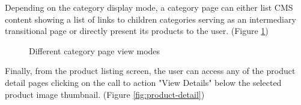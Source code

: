 Depending on the category display mode, a category page can either list CMS content showing a list of links to children categories serving as an intermediary transitional page or directly present its products to the user.
(Figure \ref{fig:category-display-modes})


\vspace{0.1cm}
\begin{figure}[htbp]
  \centering
  \qquad
  \caption{Different category page view modes}%
  \label{fig:category-display-modes}%
\end{figure}
\vspace{0.1cm}

Finally, from the product listing screen, the user can access any of the product detail pages clicking on the call to action "View Details" below the selected product image thumbnail. (Figure \ref{fig:product-detail})

